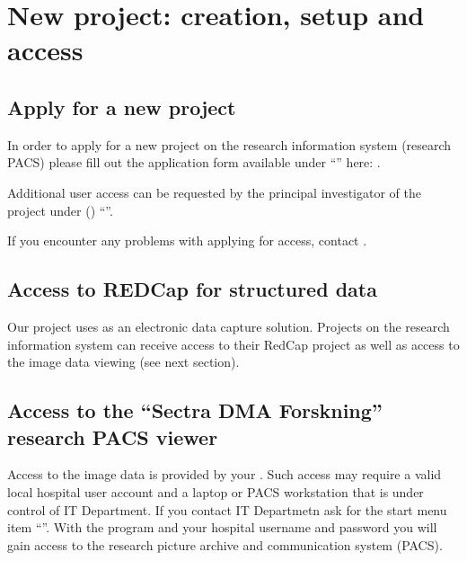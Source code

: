 \documentclass[letterpaper,10pt,english]{sphinxmanual}
\begin{document}
\section{New project: creation, setup and access}
\label{\detokenize{EndUser/index:new-project-creation-setup-and-access}}

\subsection{Apply for a new project}
\label{\detokenize{EndUser/index:apply-for-a-new-project}}
\sphinxAtStartPar
In order to apply for a new project on the research information system (research PACS)
please fill out the application form available under “”
here: .

\sphinxAtStartPar
Additional user access can be requested by the principal investigator of the project under
 () “”.

\sphinxAtStartPar
If you encounter any problems with applying for access, contact .


\subsection{Access to REDCap for structured data}
\label{\detokenize{EndUser/index:access-to-redcap-for-structured-data}}
\sphinxAtStartPar
Our project uses  as an electronic data capture solution. Projects on the research information system can receive access to their RedCap project as well as access to the image data viewing (see next section).


\subsection{Access to the “Sectra DMA Forskning” research PACS viewer}
\label{\detokenize{EndUser/index:access-to-the-sectra-dma-forskning-research-pacs-viewer}}
\sphinxAtStartPar
Access to the image data is provided by your . Such access may require a valid local hospital user account and a laptop or PACS workstation that is under control of IT Department. If you contact IT Departmetn ask for the start menu item “”. With the program and your hospital username and password you will gain access to the research picture archive and communication system (PACS).
\end{document}
